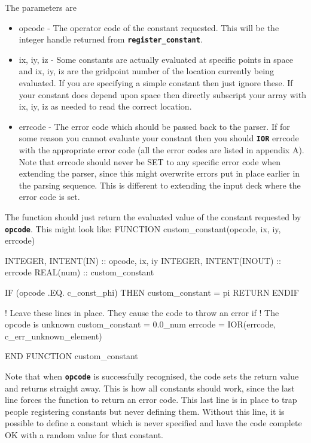 \documentclass[12pt,a4paper]{article}
\newcommand{\inlinecode}[1]{{\color{warwickred} \bf\texttt{#1}}}
\newenvironment{boxverbatim}{\lboxverbatim{none}}{\endlboxverbatim}
\begin{document}
The parameters are

\begin{itemize}
\item opcode - The operator code of the constant requested. This will be the
  integer handle returned from \inlinecode{register\_constant}.
\item ix, iy, iz - Some constants are actually evaluated at specific points in
  space and ix, iy, iz are the gridpoint number of the location currently being
  evaluated. If you are specifying a simple constant then just ignore
  these. If your constant does depend upon space then directly subscript your
  array with ix, iy, iz as needed to read the correct location.
\item errcode - The error code which should be passed back to the
  parser. If for some reason you cannot evaluate your constant then you should
  \inlinecode{IOR} errcode with the appropriate error code (all the error
  codes are listed in appendix A). Note that errcode should never be SET to
  any specific error code when extending the parser, since this might
  overwrite errors put in place earlier in the parsing sequence. This is
  different to extending the input deck where the error code is set.
\end{itemize}

The function should just return the evaluated value of the constant requested
by \inlinecode{opcode}. This might look like:
\begin{boxverbatim}
FUNCTION custom_constant(opcode, ix, iy, errcode)

  INTEGER, INTENT(IN) :: opcode, ix, iy
  INTEGER, INTENT(INOUT) :: errcode
  REAL(num) :: custom_constant

  IF (opcode .EQ. c_const_phi) THEN
    custom_constant = pi
    RETURN
  ENDIF

  ! Leave these lines in place. They cause the code to throw an error if
  ! The opcode is unknown
  custom_constant = 0.0_num
  errcode = IOR(errcode, c_err_unknown_element)

END FUNCTION custom_constant
\end{boxverbatim}

Note that when \inlinecode{opcode} is successfully recognised, the code sets
the return value and returns straight away. This is how all constants should
work, since the last line forces the function to return an error code. This
last line is in place to trap people registering constants but never defining
them. Without this line, it is possible to define a constant which is
never specified and have the code complete OK with a random value for that
constant.
\end{document}

